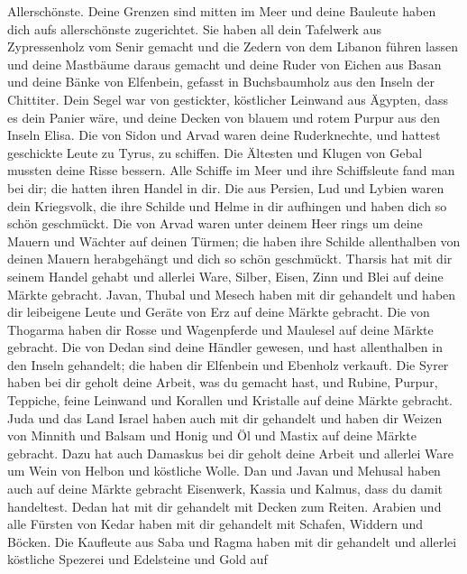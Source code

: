 Allerschönste.  Deine Grenzen sind mitten im Meer und deine
Bauleute haben dich aufs allerschönste zugerichtet.  Sie
haben all dein Tafelwerk aus Zypressenholz vom Senir gemacht und die
Zedern von dem Libanon führen lassen und deine Mastbäume daraus gemacht
 und deine Ruder von Eichen aus Basan und deine Bänke von
Elfenbein, gefasst in Buchsbaumholz aus den Inseln der Chittiter.
 Dein Segel war von gestickter, köstlicher Leinwand aus
Ägypten, dass es dein Panier wäre, und deine Decken von blauem und rotem
Purpur aus den Inseln Elisa.  Die von Sidon und Arvad waren
deine Ruderknechte, und hattest geschickte Leute zu Tyrus, zu schiffen.
 Die Ältesten und Klugen von Gebal mussten deine Risse
bessern. Alle Schiffe im Meer und ihre Schiffsleute fand man bei dir;
die hatten ihren Handel in dir.  Die aus Persien, Lud und
Lybien waren dein Kriegsvolk, die ihre Schilde und Helme in dir
aufhingen und haben dich so schön geschmückt.  Die von
Arvad waren unter deinem Heer rings um deine Mauern und Wächter auf
deinen Türmen; die haben ihre Schilde allenthalben von deinen Mauern
herabgehängt und dich so schön geschmückt.  Tharsis hat mit
dir seinem Handel gehabt und allerlei Ware, Silber, Eisen, Zinn und Blei
auf deine Märkte gebracht.  Javan, Thubal und Mesech haben
mit dir gehandelt und haben dir leibeigene Leute und Geräte von Erz auf
deine Märkte gebracht.  Die von Thogarma haben dir Rosse
und Wagenpferde und Maulesel auf deine Märkte gebracht. 
Die von Dedan sind deine Händler gewesen, und hast allenthalben in den
Inseln gehandelt; die haben dir Elfenbein und Ebenholz verkauft.
 Die Syrer haben bei dir geholt deine Arbeit, was du
gemacht hast, und Rubine, Purpur, Teppiche, feine Leinwand und Korallen
und Kristalle auf deine Märkte gebracht.  Juda und das Land
Israel haben auch mit dir gehandelt und haben dir Weizen von Minnith und
Balsam und Honig und Öl und Mastix auf deine Märkte gebracht.
 Dazu hat auch Damaskus bei dir geholt deine Arbeit und
allerlei Ware um Wein von Helbon und köstliche Wolle.  Dan
und Javan und Mehusal haben auch auf deine Märkte gebracht Eisenwerk,
Kassia und Kalmus, dass du damit handeltest.  Dedan hat mit
dir gehandelt mit Decken zum Reiten.  Arabien und alle
Fürsten von Kedar haben mit dir gehandelt mit Schafen, Widdern und
Böcken.  Die Kaufleute aus Saba und Ragma haben mit dir
gehandelt und allerlei köstliche Spezerei und Edelsteine und Gold auf
